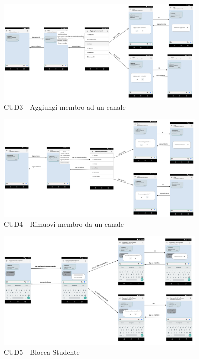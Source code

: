 \begin{figure}
	\centering
	\includegraphics[width=0.9\textwidth]{imgs/gruppo6/activities/act_cud3_aggiungi_membro_chat.pdf}
	\caption{CUD3 - Aggiungi membro ad un canale}
	\label{fig:act-cud3}
\end{figure}

\begin{figure}
	\centering
	\includegraphics[width=0.9\textwidth]{imgs/gruppo6/activities/act_cud4_rimuovi_membro_da_canale.pdf}
	\caption{CUD4 - Rimuovi membro da un canale}
	\label{fig:act-cud4}
\end{figure}

\begin{figure}
	\centering
	\includegraphics[width=0.9\textwidth]{imgs/gruppo6/activities/act_cud5_blocca_studente.pdf}
	\caption{CUD5 - Blocca Studente}
	\label{fig:act-cud5}
\end{figure}

